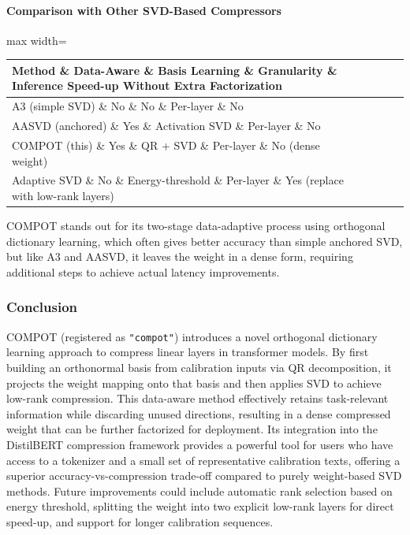 \paragraph{Comparison with Other SVD-Based Compressors}

\begin{center}
\begin{adjustbox}{max width=\columnwidth}
\renewcommand{\arraystretch}{1.2}
\begin{tabular}{lllll}
\toprule
Method \& Data-Aware \& Basis Learning \& Granularity \& Inference Speed-up Without Extra Factorization \\
\midrule
A3 (simple SVD) \& No \& No \& Per-layer \& No \\
AASVD (anchored) \& Yes \& Activation SVD \& Per-layer \& No \\
COMPOT (this) \& Yes \& QR + SVD \& Per-layer \& No (dense weight) \\
Adaptive SVD \& No \& Energy-threshold \& Per-layer \& Yes (replace with low-rank layers) \\

\bottomrule
\end{tabular}
\end{adjustbox}
\end{center}
COMPOT stands out for its two-stage data-adaptive process using orthogonal dictionary learning, which often gives better accuracy than simple anchored SVD, but like A3 and AASVD, it leaves the weight in a dense form, requiring additional steps to achieve actual latency improvements.


\subsubsection*{Conclusion}

COMPOT (registered as \texttt{"compot"}) introduces a novel orthogonal dictionary learning approach to compress linear layers in transformer models. By first building an orthonormal basis from calibration inputs via QR decomposition, it projects the weight mapping onto that basis and then applies SVD to achieve low-rank compression. This data-aware method effectively retains task-relevant information while discarding unused directions, resulting in a dense compressed weight that can be further factorized for deployment. Its integration into the DistilBERT compression framework provides a powerful tool for users who have access to a tokenizer and a small set of representative calibration texts, offering a superior accuracy-vs-compression trade-off compared to purely weight-based SVD methods. Future improvements could include automatic rank selection based on energy threshold, splitting the weight into two explicit low-rank layers for direct speed-up, and support for longer calibration sequences.

